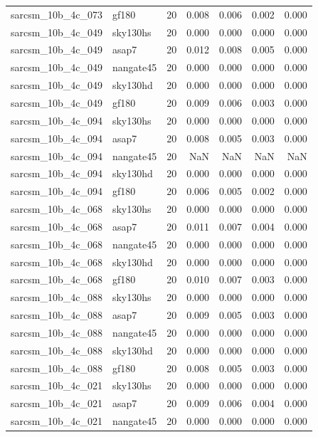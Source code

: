 \begin{tabular}{llrrrrr}
sarcsm\_10b\_4c\_073 & gf180 & 20 & 0.008 & 0.006 & 0.002 & 0.000 \\
sarcsm\_10b\_4c\_049 & sky130hs & 20 & 0.000 & 0.000 & 0.000 & 0.000 \\
sarcsm\_10b\_4c\_049 & asap7 & 20 & 0.012 & 0.008 & 0.005 & 0.000 \\
sarcsm\_10b\_4c\_049 & nangate45 & 20 & 0.000 & 0.000 & 0.000 & 0.000 \\
sarcsm\_10b\_4c\_049 & sky130hd & 20 & 0.000 & 0.000 & 0.000 & 0.000 \\
sarcsm\_10b\_4c\_049 & gf180 & 20 & 0.009 & 0.006 & 0.003 & 0.000 \\
sarcsm\_10b\_4c\_094 & sky130hs & 20 & 0.000 & 0.000 & 0.000 & 0.000 \\
sarcsm\_10b\_4c\_094 & asap7 & 20 & 0.008 & 0.005 & 0.003 & 0.000 \\
sarcsm\_10b\_4c\_094 & nangate45 & 20 & NaN & NaN & NaN & NaN \\
sarcsm\_10b\_4c\_094 & sky130hd & 20 & 0.000 & 0.000 & 0.000 & 0.000 \\
sarcsm\_10b\_4c\_094 & gf180 & 20 & 0.006 & 0.005 & 0.002 & 0.000 \\
sarcsm\_10b\_4c\_068 & sky130hs & 20 & 0.000 & 0.000 & 0.000 & 0.000 \\
sarcsm\_10b\_4c\_068 & asap7 & 20 & 0.011 & 0.007 & 0.004 & 0.000 \\
sarcsm\_10b\_4c\_068 & nangate45 & 20 & 0.000 & 0.000 & 0.000 & 0.000 \\
sarcsm\_10b\_4c\_068 & sky130hd & 20 & 0.000 & 0.000 & 0.000 & 0.000 \\
sarcsm\_10b\_4c\_068 & gf180 & 20 & 0.010 & 0.007 & 0.003 & 0.000 \\
sarcsm\_10b\_4c\_088 & sky130hs & 20 & 0.000 & 0.000 & 0.000 & 0.000 \\
sarcsm\_10b\_4c\_088 & asap7 & 20 & 0.009 & 0.005 & 0.003 & 0.000 \\
sarcsm\_10b\_4c\_088 & nangate45 & 20 & 0.000 & 0.000 & 0.000 & 0.000 \\
sarcsm\_10b\_4c\_088 & sky130hd & 20 & 0.000 & 0.000 & 0.000 & 0.000 \\
sarcsm\_10b\_4c\_088 & gf180 & 20 & 0.008 & 0.005 & 0.003 & 0.000 \\
sarcsm\_10b\_4c\_021 & sky130hs & 20 & 0.000 & 0.000 & 0.000 & 0.000 \\
sarcsm\_10b\_4c\_021 & asap7 & 20 & 0.009 & 0.006 & 0.004 & 0.000 \\
sarcsm\_10b\_4c\_021 & nangate45 & 20 & 0.000 & 0.000 & 0.000 & 0.000 \\

\end{tabular}
